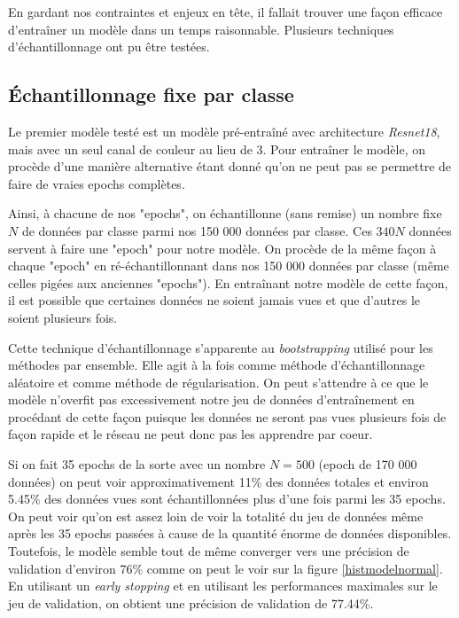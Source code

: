 En gardant nos contraintes et enjeux en tête, il fallait trouver une façon efficace d'entraîner un modèle dans un temps raisonnable. Plusieurs techniques d'échantillonnage ont pu être testées.


\subsection{Échantillonnage fixe par classe}

Le premier modèle testé est un modèle pré-entraîné avec architecture \emph{Resnet18}, mais avec un seul canal de couleur au lieu de 3. Pour entraîner le modèle, on procède d'une manière alternative étant donné qu'on ne peut pas se permettre de faire de vraies epochs complètes. 



Ainsi, à chacune de nos "epochs", on échantillonne (sans remise) un nombre fixe $N$ de données par classe parmi nos 150 000 données par classe. Ces $340N$ données servent à faire une "epoch"  pour notre modèle. On procède de la même façon à chaque "epoch" en ré-échantillonnant dans nos 150 000 données par classe (même celles pigées aux anciennes "epochs"). 
En entraînant notre modèle de cette façon, il est possible que certaines données ne soient jamais vues et que d'autres le soient plusieurs fois.


Cette technique d'échantillonnage s'apparente au \emph{bootstrapping} utilisé pour les méthodes par ensemble. Elle agit à la fois comme méthode d'échantillonnage aléatoire et comme méthode de régularisation. 
On peut s'attendre à ce que le modèle n'overfit pas excessivement notre jeu de données d'entraînement en procédant de cette façon puisque les données ne seront pas vues plusieurs fois de façon rapide et le réseau ne peut donc pas les apprendre par coeur.


Si on fait 35 epochs de la sorte avec un nombre $N=500$ (epoch de 170 000 données) on peut voir approximativement 11\% des données totales et environ 5.45\% des données vues sont échantillonnées plus d'une fois parmi les 35 epochs. 
On peut voir qu'on est assez loin de voir la totalité du jeu de données même après les 35 epochs passées à cause de la quantité énorme de données disponibles. 
Toutefois, le modèle semble tout de même converger vers une précision de validation d'environ 76\% comme on peut le voir sur la figure \ref{histmodelnormal}. 
En utilisant un \emph{early stopping} et en utilisant les performances maximales sur le jeu de validation, on obtient une précision de validation de 77.44\%.


